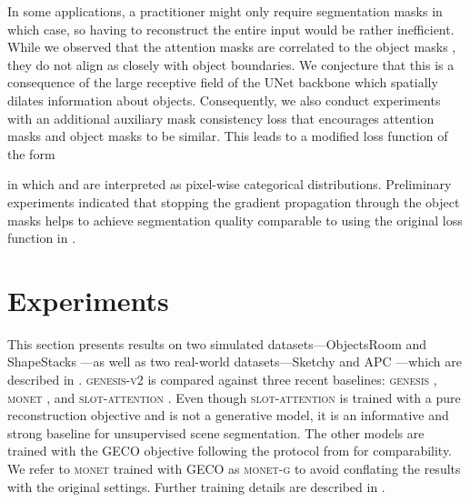 \documentclass{article}
\begin{document}
In some applications, a practitioner might only require segmentation masks in which case, so having to reconstruct the entire input would be rather inefficient.
While we observed that the attention masks  are correlated to the object masks , they do not align as closely with object boundaries.
We conjecture that this is a consequence of the large receptive field of the UNet backbone which spatially dilates information about objects.
Consequently, we also conduct experiments with an additional auxiliary mask consistency loss that encourages attention masks  and object masks  to be similar.
This leads to a modified loss function of the form

in which  and  are interpreted as pixel-wise categorical distributions.
Preliminary experiments indicated that stopping the gradient propagation through the object masks  helps to achieve segmentation quality comparable to using the original loss function in .

\section{Experiments}
\label{sec:experiments}

This section presents results on two simulated datasets---ObjectsRoom \cite{multiobjectdatasets19} and ShapeStacks \cite{groth2018shapestacks}---as well as two real-world datasets---Sketchy \cite{cabi2019scaling} and APC \cite{zeng2016multi}---which are described in .
\textsc{genesis-v2} is compared against three recent baselines: \textsc{genesis} \cite{engelcke2020genesis}, \textsc{monet} \cite{burgess2019monet}, and \textsc{slot-attention} \cite{locatello2020object}.
Even though \textsc{slot-attention} is trained with a pure reconstruction objective and is not a generative model, it is an informative and strong baseline for unsupervised scene segmentation.
The other models are trained with the GECO objective \cite{rezende2018taming} following the protocol from \citet{engelcke2020genesis} for comparability.
We refer to \textsc{monet} trained with GECO as \textsc{monet-g} to avoid conflating the results with the original settings.
Further training details are described in .
\end{document}
